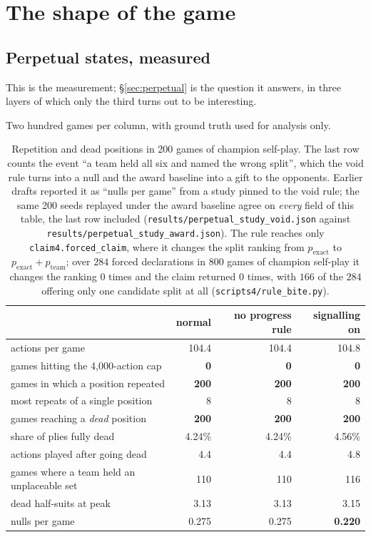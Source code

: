 \documentclass[11pt,letterpaper]{article}
\begin{document}
\section{The shape of the game}
\label{sec:shape}

\subsection{Perpetual states, measured}
\label{sec:res-perpetual}

This is the measurement; \S\ref{sec:perpetual} is the question it answers,
in three layers of which only the third turns out to be interesting.

Two hundred games per column, with ground truth used for analysis only.

\begin{table}[t]
\centering
\small
\begin{tabular}{lrrr}
\toprule
& normal & no progress rule & signalling on \\
\midrule
actions per game & 104.4 & 104.4 & 104.8 \\
games hitting the 4{,}000-action cap & \textbf{0} & \textbf{0} & \textbf{0} \\
games in which a position repeated & \textbf{200} & \textbf{200} & \textbf{200} \\
most repeats of a single position & 8 & 8 & 8 \\
games reaching a \emph{dead} position & \textbf{200} & \textbf{200} & \textbf{200} \\
share of plies fully dead & 4.24\% & 4.24\% & 4.56\% \\
actions played after going dead & 4.4 & 4.4 & 4.8 \\
games where a team held an unplaceable set & 110 & 110 & 116 \\
dead half-suits at peak & 3.13 & 3.13 & 3.15 \\
nulls per game & 0.275 & 0.275 & \textbf{0.220} \\
\bottomrule
\end{tabular}
\caption{Repetition and dead positions in 200 games of champion self-play.
The last row counts the event ``a team held all six and named the wrong
split'', which the void rule turns into a null and the award baseline into a
gift to the opponents. Earlier drafts reported it as ``nulls per game'' from a
study pinned to the void rule; the same 200 seeds replayed under the award
baseline agree on \emph{every} field of this table, the last row included
(\texttt{results/perpetual\_study\_void.json} against
\texttt{results/perpetual\_study\_award.json}). The rule reaches only
\texttt{claim4.forced\_claim}, where it changes the split ranking from
$p_\text{exact}$ to $p_\text{exact} + p_\text{team}$; over $284$ forced
declarations in $800$ games of champion self-play it changes the ranking $0$
times and the claim returned $0$ times, with $166$ of the $284$ offering only
one candidate split at all (\texttt{scripts4/rule\_bite.py}).}
\label{tab:perpetual}
\end{table}
\end{document}
